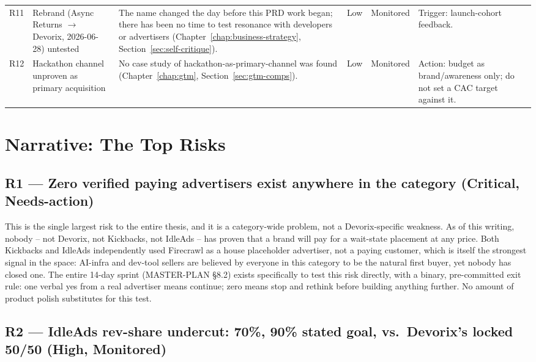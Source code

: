 \begin{longtable}{@{}p{0.6cm}p{3.6cm}p{4.6cm}p{1.5cm}p{1.7cm}p{3.6cm}@{}}
R11 & Rebrand (Async Returns $\rightarrow$ Devorix, 2026-06-28) untested & The name changed the day before this PRD work began; there has been no time to test resonance with developers or advertisers (Chapter~\ref{chap:business-strategy}, Section~\ref{sec:self-critique}). & Low & Monitored & Trigger: launch-cohort feedback. \\
R12 & Hackathon channel unproven as primary acquisition & No case study of hackathon-as-primary-channel was found (Chapter~\ref{chap:gtm}, Section~\ref{sec:gtm-comps}). & Low & Monitored & Action: budget as brand/awareness only; do not set a CAC target against it. \\
\bottomrule
\end{longtable}

\section{Narrative: The Top Risks}
\label{sec:risk-narrative}

\subsection{R1 --- Zero verified paying advertisers exist anywhere in the category (Critical, Needs-action)}

This is the single largest risk to the entire thesis, and it is a category-wide problem, not a Devorix-specific weakness. As of this writing, nobody -- not Devorix, not Kickbacks, not IdleAds -- has proven that a brand will pay for a wait-state placement at any price. Both Kickbacks and IdleAds independently used Firecrawl as a house placeholder advertiser, not a paying customer, which is itself the strongest signal in the space: AI-infra and dev-tool sellers are believed by everyone in this category to be the natural first buyer, yet nobody has closed one. The entire 14-day sprint (MASTER-PLAN \S8.2) exists specifically to test this risk directly, with a binary, pre-committed exit rule: one verbal yes from a real advertiser means continue; zero means stop and rethink before building anything further. No amount of product polish substitutes for this test.

\subsection{R2 --- IdleAds rev-share undercut: 70\%, 90\% stated goal, vs.\ Devorix's locked 50/50 (High, Monitored)}

